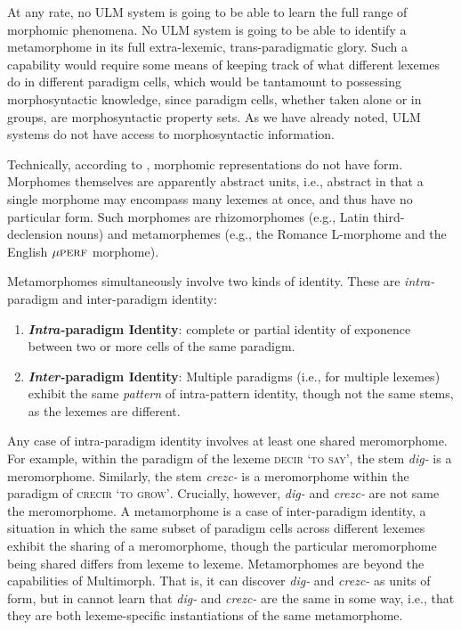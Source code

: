 At any rate, no ULM system is going to be able to learn the full range of morphomic
phenomena. No ULM system is going to be able to identify a metamorphome in its full
 extra-lexemic, trans-paradigmatic glory. Such a capability would require some means
of keeping track of what different lexemes do in different paradigm cells, which would be tantamount
to possessing morphosyntactic knowledge, since paradigm cells, whether taken alone or in groups,
are morphosyntactic property sets. As we have already noted, ULM systems do not
have access to morphosyntactic information.

	Technically, according to \cite{round:2011}, morphomic 
	representations do not have form. Morphomes
	themselves are apparently abstract units, i.e., abstract in that 
	a single morphome may encompass many lexemes at once, and thus
	have no particular form. Such morphomes are rhizomorphomes (e.g.,
	Latin third-declension nouns) and metamorphemes (e.g., the Romance L-morphome and the English
	${\mu}\textsc{perf}$ morphome).

	Metamorphomes simultaneously involve two kinds of identity. These are \emph{intra-}paradigm and {inter-}paradigm identity: 
	\begin{enumerate}
		\item \textbf{\emph{Intra-}paradigm Identity}: complete or partial identity of exponence between two or more cells of the same paradigm. 
		\item \textbf{\emph{Inter-}paradigm Identity}: Multiple paradigms (i.e., for multiple lexemes) exhibit the same \emph{pattern} of intra-pattern identity, though not the same stems, as the lexemes are different.
	\end{enumerate} 
Any case of intra-paradigm identity involves at least one shared 
meromorphome. For example, within the paradigm of the lexeme 
\textsc{decir} \textsc{`to say'}, 
the stem \textit{dig-} is a meromorphome. Similarly, the stem \textit{crezc-} 
is a meromorphome within the paradigm of 
\textsc{crecir} \textsc{`to grow'}. Crucially, however, 
\textit{dig-} and \textit{crezc-} are not same the meromorphome. 
A metamorphome is a case of inter-paradigm identity, a situation 
in which the same subset of paradigm cells across different lexemes 
exhibit the sharing of a meromorphome, 
though the particular meromorphome being shared differs from lexeme to 
lexeme. Metamorphomes are beyond the capabilities of Multimorph. 
That is, it can discover \textit{dig-} and \textit{crezc-} as units of form, 
but in cannot learn that \textit{dig-} and \textit{crezc-} are the same 
in some way, i.e., that they are both lexeme-specific instantiations of the
same metamorphome.

